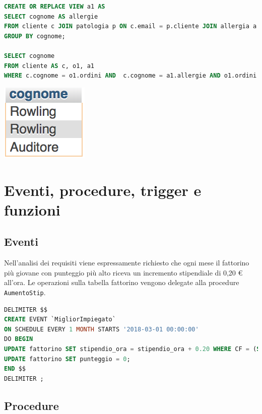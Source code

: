 \documentclass[10pt]{article}
\begin{document}
\begin{enumerate}[noitemsep]
\begin{lstlisting}[language=sql]
CREATE OR REPLACE VIEW a1 AS
SELECT cognome AS allergie
FROM cliente c JOIN patologia p ON c.email = p.cliente JOIN allergia a ON p.allergia = a.codice
GROUP BY cognome;

SELECT cognome
FROM cliente AS c, o1, a1
WHERE c.cognome = o1.ordini AND  c.cognome = a1.allergie AND o1.ordini = a1.allergie
\end{lstlisting}	
\begin{center}
\hspace*{-1cm}
\includegraphics[scale=0.9]{query3.png}
\hspace*{-1cm}
\end{center}

	\end{enumerate}
		\section{Eventi, procedure, trigger e funzioni}
		\subsection{Eventi}
		Nell'analisi dei requisiti viene espressamente richiesto che ogni mese il fattorino pi\`u giovane con punteggio pi\`u alto riceva un incremento stipendiale di 0,20 \euro{} all'ora.
		Le operazioni sulla tabella fattorino vengono delegate alla procedure \texttt{AumentoStip}.
\begin{lstlisting}[language=sql]
DELIMITER $$
CREATE EVENT `MigliorImpiegato` 
ON SCHEDULE EVERY 1 MONTH STARTS '2018-03-01 00:00:00'
DO BEGIN 
UPDATE fattorino SET stipendio_ora = stipendio_ora + 0.20 WHERE CF = (SELECT CF FROM fattorino WHERE CF NOT IN (SELECT f1.CF FROM fattorino f1 CROSS JOIN fattorino f2 WHERE f1.data_di_nascita < f2.data_di_nascita AND f1.punteggio < f2.punteggio AND f1.CF != f2.CF));
UPDATE fattorino SET punteggio = 0;
END $$
DELIMITER ;
\end{lstlisting}
		\subsection{Procedure}
\end{document}
